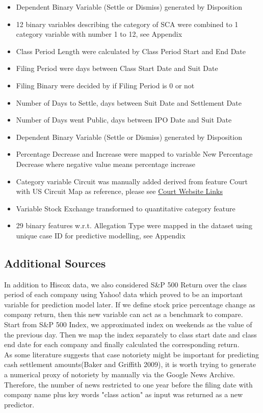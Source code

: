  \begin{itemize}
     \item Dependent Binary Variable (Settle or Dismiss) generated by Disposition 
     \item 12 binary variables describing the category of SCA were combined to 1 category variable with number 1 to 12, see Appendix
     \item Class Period Length were calculated by Class Period Start and End Date
     \item Filing Period were days between Class Start Date and Suit Date
     \item Filing Binary were decided by if Filing Period is 0 or not 
     \item Number of Days to Settle, days between Suit Date and Settlement Date
     \item Number of Days went Public, days between IPO Date and Suit Date
     \item Dependent Binary Variable (Settle or Dismiss) generated by Disposition 
     \item Percentage Decrease and Increase were mapped to variable New Percentage Decrease where negative value means percentage increase
     \item Category variable Circuit was manually added derived from feature Court with US Circuit Map as reference, please see \href{http://www.uscourts.gov/about-federal-courts/federal-courts-public/court-website-links}{\colorbox{Graylight}{Court Website Links}}  
     \item Variable Stock Exchange transformed to quantitative category feature
     \item 29 binary features w.r.t. Allegation Type were mapped in the dataset using unique case ID for predictive modelling, see Appendix
  \end{itemize}

\subsection{Additional Sources}
In addition to Hiscox data, we also considered S\&P 500 Return over the class period of each company using Yahoo! data which proved to be an important variable for prediction model later. If we define stock price percentage change as company return, then this new variable can act as a benchmark to compare. Start from S\&P 500 Index, we approximated index on weekends as the value of the previous day. Then we map the index separately to class start date and class end date for each company and finally calculated the corresponding return. \\
\indent As some literature suggests that case notoriety might be important for predicting cash settlement amounts(Baker and Griffith 2009), it is worth trying to generate a numerical proxy of notoriety by manually via the Google News Archive. Therefore, the number of news restricted to one year before the filing date with company name plus key words "class action" as input was returned as a new predictor.

